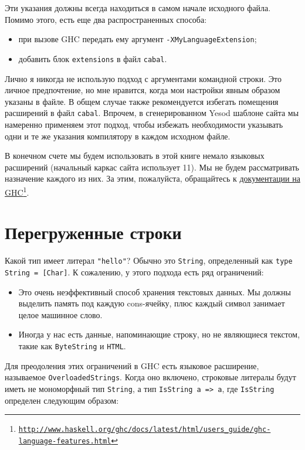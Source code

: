 Эти указания должны всегда находиться в самом начале исходного файла. Помимо этого, есть еще два распространенных способа:
\begin{itemize}
\item при вызове GHC передать ему аргумент \lstinline'-XMyLanguageExtension';
\item добавить блок \texttt{extensions} в файл \texttt{cabal}.
\end{itemize}

Лично я никогда не использую подход с аргументами командной строки. Это личное предпочтение, но мне нравится, когда мои настройки явным образом указаны в файле. В общем случае также рекомендуется избегать помещения расширений в файл \texttt{cabal}. Впрочем, в сгенерированном Yesod шаблоне сайта  мы намеренно применяем этот подход, чтобы избежать необходимости указывать одни и те же указания компилятору в каждом исходном файле.

В конечном счете мы будем использовать в этой книге немало языковых расширений (начальный каркас сайта использует 11). Мы не будем рассматривать назначение каждого из них. За этим, пожалуйста, обращайтесь к \href{http://www.haskell.org/ghc/docs/latest/html/users\_guide/ghc-language-features.html}{документации на GHC}\footnote{\href{http://www.haskell.org/ghc/docs/latest/html/users\_guide/ghc-language-features.html}{\texttt{http://www.haskell.org/ghc/docs/latest/html/users\_guide/ghc-language-features.html}}}.

\section{Перегруженные строки}

Какой тип имеет литерал \lstinline'"hello"'? Обычно это \lstinline'String', определенный как \lstinline'type String = [Char]'. К сожалению, у этого подхода есть ряд ограничений:
\begin{itemize}
\item Это очень неэффективный способ хранения текстовых данных. Мы должны выделить память под каждую cons-ячейку, плюс каждый символ занимает целое машинное слово.
\item Иногда у нас есть данные, напоминающие строку, но не являющиеся текстом, такие как \lstinline'ByteString' и \lstinline'HTML'.
\end{itemize}

Для преодоления этих ограничений в GHC есть языковое расширение, называемое \lstinline'OverloadedStrings'. Когда оно включено, строковые литералы будут иметь не мономорфный тип \lstinline'String', а тип \lstinline'IsString a => a', где \lstinline'IsString' определен следующим образом:


